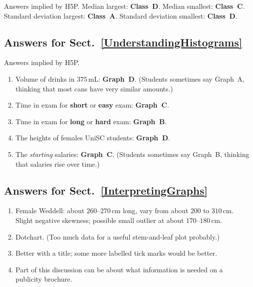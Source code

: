 \documentclass[
  11pt,
  a4paper,
  krantz2]{krantz}
\providecommand{\tightlist}{%
  \setlength{\itemsep}{0pt}\setlength{\parskip}{0pt}}
\begin{document}
\begin{footnotesize}
Answers implied by H5P.
Median largest: \textbf{Class~D}.
Median smallest: \textbf{Class~C}.
Standard deviation largest: \textbf{Class~A}.
Standard deviation smallest: \textbf{Class~D}.

\subsection*{Answers for Sect.~\ref{UnderstandingHistograms}}\label{answers-for-sect.-refunderstandinghistograms}

Answers implied by H5P.

\begin{enumerate}
\def\labelenumi{\arabic{enumi}.}
\tightlist
\item
  Volume of drinks in \(375\,\text{mL}\): \textbf{Graph~D}.
  (Students sometimes say Graph~A, thinking that most cans have very similar amounts.)
\item
  Time in exam for \textbf{short} or \textbf{easy} exam: \textbf{Graph~C}.
\item
  Time in exam for \textbf{long} or \textbf{hard} exam: \textbf{Graph~B}.
\item
  The heights of females UniSC students: \textbf{Graph~D}.
\item
  The \emph{starting} salaries: \textbf{Graph~C}.
  (Students sometimes say Graph~B, thinking that salaries rise over time.)
\end{enumerate}

\subsection*{Answers for Sect.~\ref{InterpretingGraphs}}\label{answers-for-sect.-refinterpretinggraphs}

\begin{enumerate}
\def\labelenumi{\arabic{enumi}.}
\tightlist
\item
  Female Weddell: about \(260\)--\(270\,\text{cm}\) long, vary from about \(200\) to \(310\,\text{cm}\).
  Slight negative skewness; possible small outlier at about \(170\)--\(180\,\text{cm}\).
\item
  Dotchart.
  (Too much data for a useful stem-and-leaf plot probably.)
\item
  Better with a title; some more labelled tick marks would be better.
\item
  Part of this discussion can be about what information is needed on a publicity brochure.
\end{enumerate}


\end{footnotesize}
\end{document}
